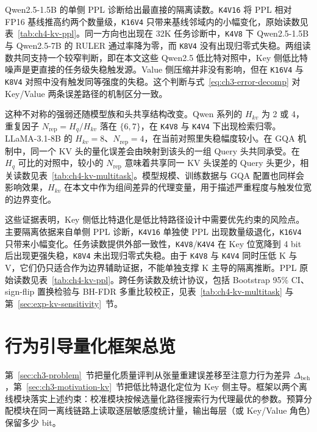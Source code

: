 

Qwen2.5-1.5B 的单侧 PPL 诊断给出最直接的隔离读数。\texttt{K4V16} 将 PPL 相对 FP16 基线推高约两个数量级，\texttt{K16V4} 只带来基线邻域内的小幅变化，原始读数见表~\ref{tab:ch4-kv-ppl}。同一方向也出现在 32K 任务诊断中，\texttt{K4V8} 下 Qwen2.5-1.5B 与 Qwen2.5-7B 的 RULER 通过率降为零，而 \texttt{K8V4} 没有出现归零式失稳。两组读数共同支持一个较窄判断，即在本文这些 Qwen2.5 低比特对照中，Key 侧低比特噪声是更直接的任务级失稳触发源。Value 侧压缩并非没有影响，但在 \texttt{K16V4} 与 \texttt{K8V4} 对照中没有触发同等强度的失稳。这个判断与式~\eqref{eq:ch3-error-decomp} 对 Key/Value 两条误差路径的机制区分一致。

这种不对称的强弱还随模型族和头共享结构改变。Qwen 系列的 $H_{kv}$ 为 2 或 4，重复因子 $N_{\mathrm{rep}}=H_q/H_{kv}$ 落在 $\{6,7\}$，在 \texttt{K4V8} 与 \texttt{K4V4} 下出现检索归零。LLaMA-3.1-8B 的 $H_{kv}=8$、$N_{\mathrm{rep}}=4$，在当前对照里失稳幅度较小。在 GQA 机制中，同一个 KV 头的量化误差会由映射到该头的一组 Query 头共同承受。在 $H_q$ 可比的对照中，较小的 $N_{\mathrm{rep}}$ 意味着共享同一 KV 头误差的 Query 头更少，相关读数见表~\ref{tab:ch4-kv-multitask}。模型规模、训练数据与 GQA 配置也同样会影响效果，$H_{kv}$ 在本文中作为组间差异的代理变量，用于描述严重程度与触发位宽的边界变化。

这些证据表明，Key 侧低比特退化是低比特路径设计中需要优先约束的风险点。主要隔离依据来自单侧 PPL 诊断，\texttt{K4V16} 单独使 PPL 出现数量级退化，\texttt{K16V4} 只带来小幅变化。任务读数提供外部一致性，\texttt{K4V8}/\texttt{K4V4} 在 Key 位宽降到 4 bit 后出现更强失稳，\texttt{K8V4} 未出现归零式失稳。由于 \texttt{K4V8} 与 \texttt{K4V4} 同时压低 K 与 V，它们仍只适合作为边界辅助证据，不能单独支撑 K 主导的隔离推断。PPL 原始读数见表~\ref{tab:ch4-kv-ppl}。跨任务读数及统计协议，包括 Bootstrap 95\% CI、sign-flip 置换检验与 BH-FDR 多重比较校正，见表~\ref{tab:ch4-kv-multitask} 与第~\ref{sec:exp-kv-sensitivity}~节。

\section{行为引导量化框架总览}
\label{sec:ch3-framework}

第~\ref{sec:ch3-problem}~节把量化质量评判从张量重建误差移至注意力行为差异 $\Delta_{\mathrm{beh}}$，第~\ref{sec:ch3-motivation-kv}~节把低比特退化定位为 Key 侧主导。框架以两个离线模块落实上述约束：校准模块按候选量化路径搜索行为代理最优的参数。预算分配模块在同一离线链路上读取逐层敏感度统计量，输出每层（或 Key/Value 角色）保留多少 bit。

